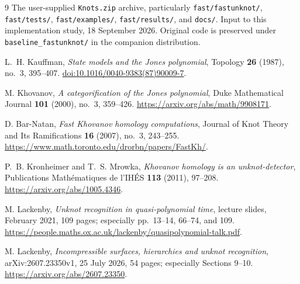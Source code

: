 \documentclass[11pt,letterpaper]{article}
\theoremstyle{definition}
\begin{document}
\begin{thebibliography}{9}
The user-supplied \texttt{Knots.zip} archive, particularly
\texttt{fast/fastunknot/}, \texttt{fast/tests/}, \texttt{fast/examples/},
\texttt{fast/results/}, and \texttt{docs/}. Input to this implementation study,
18 September 2026. Original code is preserved under
\texttt{baseline\_fastunknot/} in the companion distribution.

L.~H. Kauffman, \emph{State models and the Jones polynomial}, Topology
\textbf{26} (1987), no.~3, 395--407.
\href{https://doi.org/10.1016/0040-9383(87)90009-7}{doi:10.1016/0040-9383(87)90009-7}.

M. Khovanov, \emph{A categorification of the Jones polynomial}, Duke
Mathematical Journal \textbf{101} (2000), no.~3, 359--426.
\url{https://arxiv.org/abs/math/9908171}.

D. Bar-Natan, \emph{Fast Khovanov homology computations}, Journal of Knot Theory
and Its Ramifications \textbf{16} (2007), no.~3, 243--255.
\url{https://www.math.toronto.edu/drorbn/papers/FastKh/}.

P.~B. Kronheimer and T.~S. Mrowka, \emph{Khovanov homology is an unknot-detector},
Publications Math\'ematiques de l'IH\'ES \textbf{113} (2011), 97--208.
\url{https://arxiv.org/abs/1005.4346}.

M. Lackenby, \emph{Unknot recognition in quasi-polynomial time}, lecture slides,
February 2021, 109 pages; especially pp.~13--14, 66--74, and 109.
\url{https://people.maths.ox.ac.uk/lackenby/quasipolynomial-talk.pdf}.

M. Lackenby, \emph{Incompressible surfaces, hierarchies and unknot recognition},
arXiv:2607.23350v1, 25 July 2026, 54 pages; especially Sections 9--10.
\url{https://arxiv.org/abs/2607.23350}.
\end{thebibliography}
\end{document}
